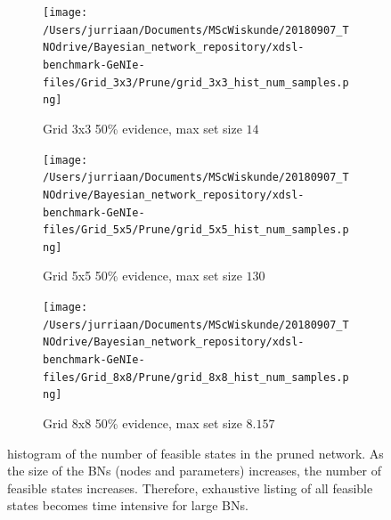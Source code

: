 \documentclass[a4paper, twoside, 11pt]{report}
\theoremstyle{plain}
\theoremstyle{definition}
\theoremstyle{remark}
\begin{document}
\begin{figure}[h!]
\begin{subfigure}{.3\linewidth}
\texttt{[image: /Users/jurriaan/Documents/MScWiskunde/20180907\_TNOdrive/Bayesian\_network\_repository/xdsl-benchmark-GeNIe-files/Grid\_3x3/Prune/grid\_3x3\_hist\_num\_samples.png]}
\caption{Grid 3x3 50\% evidence, max set size $14$}%
\label{grid_3x3}%
\end{subfigure}\hfill%
\begin{subfigure}{.3\linewidth}
\texttt{[image: /Users/jurriaan/Documents/MScWiskunde/20180907\_TNOdrive/Bayesian\_network\_repository/xdsl-benchmark-GeNIe-files/Grid\_5x5/Prune/grid\_5x5\_hist\_num\_samples.png]}
\caption{Grid 5x5 50\% evidence, max set size $130$}%
\label{grid_5x5}%
\end{subfigure}\hfill%
\begin{subfigure}{.3\linewidth}
\texttt{[image: /Users/jurriaan/Documents/MScWiskunde/20180907\_TNOdrive/Bayesian\_network\_repository/xdsl-benchmark-GeNIe-files/Grid\_8x8/Prune/grid\_8x8\_hist\_num\_samples.png]}
\caption{Grid 8x8 50\% evidence, max set size $8.157$}%
\label{grid_8x8}%
\end{subfigure}\hfill%

\vspace{0.75pc}
\caption{histogram of the number of feasible states in the pruned network. As the size of the BNs (nodes and parameters) increases, the number of feasible states increases. Therefore, exhaustive listing of all feasible states becomes time intensive for large BNs.}
\label{results1}
\end{figure}

\newpage
\end{document}

